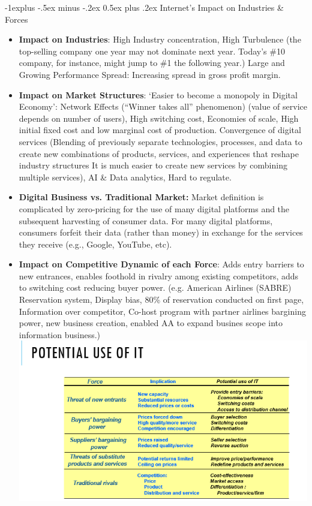 \documentclass[12pt, landscape]{article}
\makeatletter
\renewcommand{\subsection}{\@startsection{subsection}{2}{0mm}%
                                {-1explus -.5ex minus -.2ex}%
                                {0.5ex plus .2ex}%
                                {\normalfont\normalsize\bfseries}}
\makeatother
\begin{document}
\begin{multicols*}{3}
\subsection{Internet's Impact on Industries \& Forces}
\begin{itemize}
\item \textbf{Impact on Industries}: High Industry concentration, High Turbulence (the top-selling company one year may not dominate next year. Today’s \#10 company, for instance, might jump to \#1 the following year.) Large and Growing Performance Spread: Increasing spread in gross profit margin.
\item \textbf{Impact on Market Structures}: `Easier to become a monopoly in Digital Economy': Network Effects (“Winner takes all” phenomenon) (value of service depends on number of users), High switching cost, Economies of scale, High initial fixed cost and low marginal cost of production. Convergence of digital services (Blending of previously separate technologies, processes, and data to create new combinations of products, services, and experiences that reshape industry structures It is much easier to create new services by combining multiple services), AI \& Data analytics, Hard to regulate.
\item \textbf{Digital Business vs. Traditional Market:} Market definition is complicated by zero-pricing for the use of many digital platforms and the subsequent harvesting of consumer data. For many digital platforms, consumers forfeit their data (rather than money) in exchange for the services they receive (e.g., Google, YouTube, etc).
\item \textbf{Impact on Competitive Dynamic of each Force}:  Adds entry barriers to new entrances, enables foothold in rivalry among existing competitors, adds to switching cost reducing buyer power. (e.g. American Airlines (SABRE) Reservation system, Display bias, 80\% of reservation conducted on first page, Information over competitor, Co-host program with partner airlines bargining power, new business creation, enabled AA to expand busines scope into information business.)
\includegraphics[width = 0.85\linewidth]{portersIT}

\end{itemize}
\end{multicols*}
\end{document}
